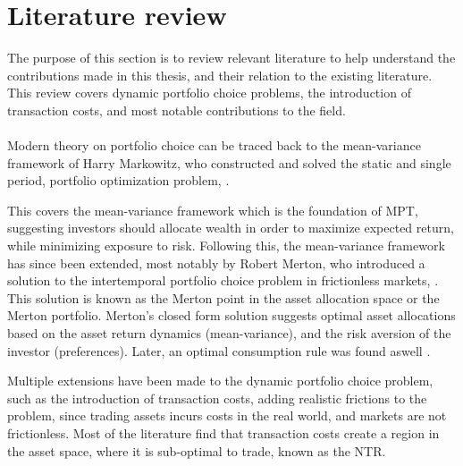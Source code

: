 \documentclass[11pt]{article}
\begin{document}
\fi


\section{Literature review}\label{sec: literature}
The purpose of this section is to review relevant literature to help understand the contributions made in this thesis, and their relation to the existing literature. 
This review covers dynamic portfolio choice problems, the introduction of transaction costs, and most notable contributions to the field.\\~\\
Modern theory on portfolio choice can be traced back to the mean-variance framework of Harry Markowitz, who
constructed and solved the static and single period, portfolio optimization problem, \autocite{Markowitz1952}. 

This covers the mean-variance framework which is the foundation of \ac{MPT}, suggesting investors should allocate wealth in order to maximize expected return, while minimizing exposure to risk.
Following this, the mean-variance framework has since been extended,
most notably by Robert Merton, who introduced a solution to the intertemporal portfolio choice problem in frictionless markets, \autocite{Merton1969}.
This solution is known as the Merton point in the asset allocation space or the Merton portfolio.
Merton's closed form solution suggests optimal asset allocations based on the asset return dynamics (mean-variance), and the risk aversion of the investor (preferences).
Later, an optimal consumption rule was found aswell \autocite{Merton1971}.

Multiple extensions have been made to the dynamic portfolio choice problem, such as the introduction of transaction costs,
adding realistic frictions to the problem, since trading assets incurs costs in the real world, and markets are not frictionless.
Most of the literature find that transaction costs create a region in the asset space, where it is sub-optimal to trade, known as the \ac{NTR}.
\end{document}
